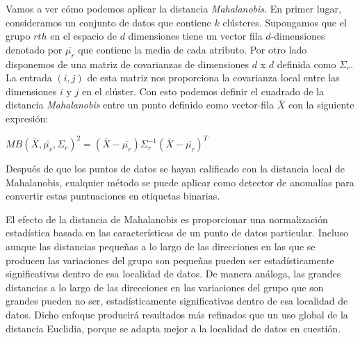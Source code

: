 Vamos a ver cómo podemos aplicar la distancia \textit{Mahalanobis}. En primer
lugar, consideramos un conjunto de datos que contiene $k$ clústeres. Supongamos
que el grupo $rth$ en el espacio de $d$ dimensiones tiene un vector fila $d$-dimensiones
denotado por $\overline{\mu_r}$ que contiene la media de cada atributo. Por
otro lado disponemos de una matriz de covarianzas de dimensiones $d$ x $d$
definida como $\Sigma_r$. La entrada $(i,j)$ de esta matriz nos proporciona
la covarianza local entre las dimensiones $i$ y $j$ en el clúster. Con esto podemos
definir el cuadrado de la distancia \textit{Mahalanobis} entre un punto 
definido como vector-fila $\overline{X}$ con la siguiente expresión:

\begin{center}
    $MB(\overline{X}, \overline{\mu_r}, \Sigma_r)^2 = (\overline{X} - \overline{\mu_r})
    \Sigma_r^{-1} (\overline{X} - \overline{\mu_r})^T$
\end{center}
Después de que los puntos de datos se hayan calificado con la distancia
local de Mahalanobis, cualquier método se puede aplicar
como detector de anomalías para convertir estas puntuaciones en etiquetas binarias.

El efecto de la distancia de Mahalanobis es proporcionar
una normalización estadística basada en las características de un punto
de datos particular. Incluso aunque las distancias pequeñas a lo largo de las 
direcciones en las que se producen las variaciones del grupo son pequeñas
pueden ser estadísticamente significativas dentro de esa localidad de datos.
De manera análoga, las grandes distancias a lo largo de las direcciones
en las variaciones del grupo que son grandes pueden no ser,
estadísticamente significativas dentro de esa localidad de datos.
Dicho enfoque producirá resultados más refinados que un uso global
de la distancia Euclidia, porque se adapta mejor a la localidad de
datos en cuestión.

